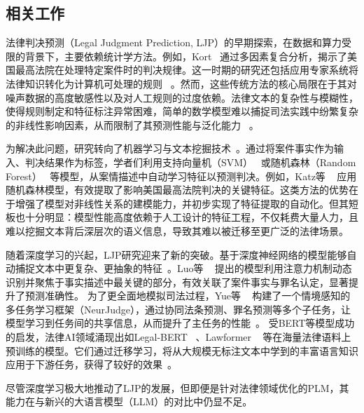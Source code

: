 \subsection{\heiti 相关工作}
法律判决预测（Legal Judgment Prediction, LJP）的早期探索，在数据和算力受限的背景下，主要依赖统计学方法。例如，Kort~\cite{kort1957predicting} 通过多因素复合分析，揭示了美国最高法院在处理特定案件时的判决规律。这一时期的研究还包括应用专家系统将法律知识转化为计算机可处理的规则 ~\cite{susskind1986expert}。然而，这些传统方法的核心局限在于其对噪声数据的高度敏感性以及对人工规则的过度依赖。法律文本的复杂性与模糊性，使得规则制定和特征标注异常困难，简单的数学模型难以捕捉司法实践中纷繁复杂的非线性影响因素，从而限制了其预测性能与泛化能力 ~\cite{deng2023syllogistic,deng2023syllogistic}。

为解决此问题，研究转向了机器学习与文本挖掘技术~\cite{chen2013text,goncalves2005evaluating}。通过将案件事实作为输入、判决结果作为标签，学者们利用支持向量机（SVM）~\cite{kianmehr2006crime} 或随机森林（Random Forest） ~\cite{sulea2017exploring}等模型，从案情描述中自动学习特征以预测判决。例如，Katz等 ~\cite{sulea2017exploring} 应用随机森林模型，有效提取了影响美国最高法院判决的关键特征。这类方法的优势在于增强了模型对非线性关系的建模能力，并初步实现了特征提取的自动化。但其短板也十分明显：模型性能高度依赖于人工设计的特征工程，不仅耗费大量人力，且难以挖掘文本背后深层次的语义信息，导致其难以被迁移至更广泛的法律场景。

随着深度学习的兴起，LJP研究迎来了新的突破。基于深度神经网络的模型能够自动捕捉文本中更复杂、更抽象的特征~\cite{cheng2025legal,dong2021legal,feng2022legal,jiang2018interpretable}。Luo等 ~\cite{huang2019improved} 提出的模型利用注意力机制动态识别并聚焦于事实描述中最关键的部分，有效关联了案件事实与罪名认定，显著提升了预测准确性。
为了更全面地模拟司法过程，Yue等 ~\cite{yue2021neurjudge} 构建了一个情境感知的多任务学习框架（NeurJudge），通过协同法条预测、罪名预测等多个子任务，让模型学习到任务间的共享信息，从而提升了主任务的性能~\cite{liu2019multi}。
受BERT等模型成功的启发，法律AI领域涌现出如Legal-BERT ~\cite{liu2021robustly,chalkidis2020legal,deepa2021bidirectional,devlin2019bert,fan2022multi}、Lawformer ~\cite{xiao2021lawformer,du2022glm,fei2023lawbench} 等在海量法律语料上预训练的模型。它们通过迁移学习，将从大规模无标注文本中学到的丰富语言知识应用于下游任务，获得了较好的效果~\cite{cui2021pre,houlsby2019parameter,hu2018few}。

尽管深度学习极大地推动了LJP的发展，但即便是针对法律领域优化的PLM，其能力在与新兴的大语言模型（LLM）的对比中仍显不足。

